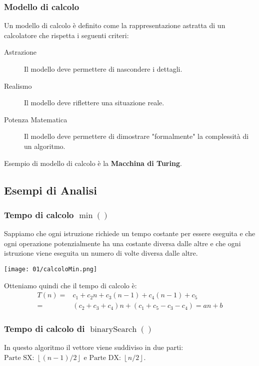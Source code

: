         \subsubsection{Modello di calcolo}
            \begin{definition}
                Un modello di calcolo è definito come la rappresentazione astratta di un calcolatore che rispetta i seguenti criteri:
                \begin{description}
                    \item[Astrazione] Il modello deve permettere di nascondere i dettagli.
                    \item[Realismo] Il modello deve riflettere una situazione reale.
                    \item[Potenza Matematica] Il modello deve permettere di dimostrare "formalmente" la complessità di un algoritmo.    
                \end{description}
            \end{definition}
            Esempio di modello di calcolo è la \textbf{Macchina di Turing}.
    \subsection{Esempi di Analisi}
        \subsubsection{Tempo di calcolo $\min()$}
            Sappiamo che ogni istruzione richiede un tempo costante per essere eseguita e che ogni operazione potenzialmente ha una costante diversa dalle altre e che ogni istruzione viene eseguita un numero di volte diversa dalle altre.
            
            \texttt{[image: 01/calcoloMin.png]}
            
            Otteniamo quindi che il tempo di calcolo è:
            \[
                \begin{aligned}
                    T(n)=&c_1+c_2n+c_3(n-1)+c_4(n-1)+c_5\\
                    =&(c_2+c_3+c_4)n+(c_1+c_5-c_3-c_4) = an+b
                \end{aligned}
            \]
        \subsubsection{Tempo di calcolo di $\operatorname{binarySearch}()$}
            In questo algoritmo il vettore viene suddiviso in due parti:
            $ \text{Parte SX: } \left\lfloor(n-1)/2\right\rfloor $ e $ \text{Parte DX: } \left\lfloor n/2\right\rfloor $.
            
